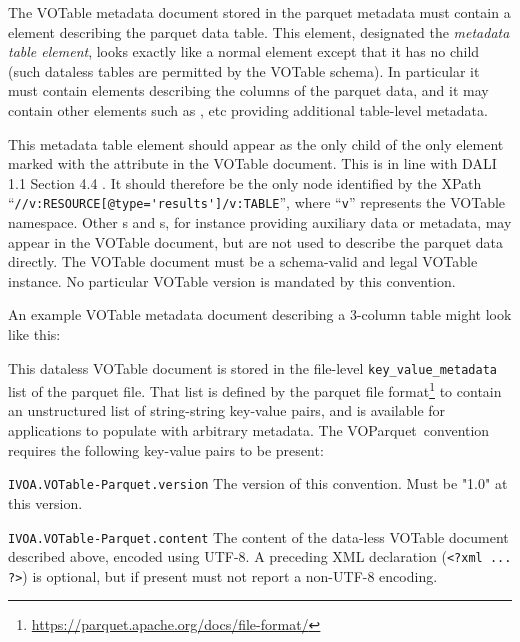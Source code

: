 \documentclass[11pt,a4paper]{ivoa}
\newcommand{\voparquet}{VOParquet}
\begin{document}
The VOTable metadata document stored in the parquet metadata
must contain a  element describing the parquet data table.
This  element, designated the {\em metadata table element},
looks exactly like a normal  element
except that it has no  child
(such dataless tables are permitted by the VOTable schema).
In particular it must contain  elements describing the
columns of the parquet data,
and it may contain other elements such as ,  etc
providing additional table-level metadata.
 
This metadata table element should appear as the
only  child of the only  element
marked with the  attribute in the VOTable document.
This is in line with DALI 1.1 Section 4.4 \citep{2017ivoa.spec.0517D}.
It should therefore be the only node identified by the XPath
``\verb|//v:RESOURCE[@type='results']/v:TABLE|'',
where ``{\tt v}'' represents the VOTable namespace.
Other s and s,
for instance providing auxiliary data or metadata,
may appear in the VOTable document,
but are not used to describe the parquet data directly.
The VOTable document must be a schema-valid and legal VOTable instance.
No particular VOTable version is mandated by this convention.

An example VOTable metadata document describing a 3-column table
might look like this:


This dataless VOTable document is stored in the file-level
{\tt key\_value\_metadata} list of the parquet file.
That list is defined by the parquet file
format\footnote{\url{https://parquet.apache.org/docs/file-format/}}
to contain an unstructured list of string-string key-value pairs,
and is available for applications to populate with arbitrary metadata.
The \voparquet\ convention requires the following key-value pairs
to be present:
\begin{bigdescription}
\item[{\tt IVOA.VOTable-Parquet.version}]
   The version of this convention.  Must be "1.0" at this version.
\item[{\tt IVOA.VOTable-Parquet.content}]
   The content of the data-less VOTable document described above,
   encoded using UTF-8.
   A preceding XML declaration (\verb|<?xml ... ?>|) is optional,
   but if present must not report a non-UTF-8 encoding.
\end{bigdescription}
\end{document}
